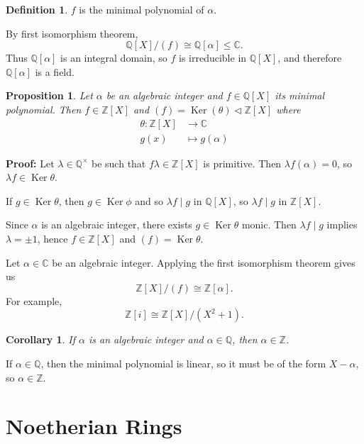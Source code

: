 \documentclass[12pt]{article}
\DeclareMathOperator{\Ker}{Ker}
\newtheorem{corollary}{Corollary}[section]
\newtheorem{proposition}{Proposition}[section]
\theoremstyle{definition}
\newtheorem{definition}{Definition}[section]
\theoremstyle{remark}
\begin{document}
\begin{definition}
	$f$ is the minimal polynomial of $\alpha$.
\end{definition}

By first isomorphism theorem,
\[
	\mathbb{Q}[X] / (f) \cong \mathbb{Q}[\alpha] \leq \mathbb{C}
.\]
Thus $\mathbb{Q}[\alpha]$ is an integral domain, so $f$ is irreducible in $\mathbb{Q}[X]$, and therefore $\mathbb{Q}[\alpha]$ is a field.

\begin{proposition}
	Let $\alpha$ be an algebraic integer and $f \in \mathbb{Q}[X]$ its minimal polynomial. Then $f \in \mathbb{Z}[X]$ and $(f) = \Ker(\theta) \lhd \mathbb{Z}[X]$ where
	\begin{align*}
		\theta : \mathbb{Z}[X] &\to \mathbb{C} \\
		g(x) &\mapsto g(\alpha)
	\end{align*}
\end{proposition}

\begin{adjustbox}{minipage = \columnwidth - 25.5pt, margin=1em, frame=1pt, margin=0em}
	\textbf{Proof:} Let $\lambda \in \mathbb{Q}^{\times}$ be such that $f \lambda \in \mathbb{Z}[X]$ is primitive. Then $\lambda f(\alpha) = 0$, so $\lambda f \in \Ker \theta$.

	If $g \in \Ker \theta$, then $g \in \Ker \phi$ and so $\lambda f \mid g$ in $\mathbb{Q}[X]$, so $\lambda f \mid g$ in $\mathbb{Z}[X]$.

	Since $\alpha$ is an algebraic integer, there exists $g \in \Ker \theta$ monic. Then $\lambda f \mid g$ implies $\lambda = \pm 1$, hence  $f \in \mathbb{Z}[X]$ and $(f) = \Ker \theta$.
\end{adjustbox}

Let $\alpha \in \mathbb{C}$ be an algebraic integer. Applying the first isomorphism theorem gives us
\[
	\mathbb{Z}[X] / (f) \cong \mathbb{Z}[\alpha]
.\]
For example,
\[
	\mathbb{Z}[i] \cong \mathbb{Z}[X] / (X^2 + 1)
.\]

\begin{corollary}
	If $\alpha$ is an algebraic integer and $\alpha \in \mathbb{Q}$, then $\alpha \in \mathbb{Z}$.
\end{corollary}

If $\alpha \in \mathbb{Q}$, then the minimal polynomial is linear, so it must be of the form $X - \alpha$, so $\alpha \in \mathbb{Z}$.

\newpage

\section{Noetherian Rings}%
\label{sec:noetherian_rings}
\end{document}
